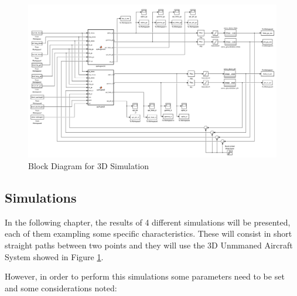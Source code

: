 \begin{figure}
	\centering
	\includegraphics[width=1.1\textwidth,height=1.1\textheight,keepaspectratio]{figures/diagram_3D.png}
	\caption{Block Diagram for 3D Simulation}
   	\label{fig:diagram3D}
\end{figure}

\clearpage


\subsection*{Simulations}

In the following chapter, the results of 4 different simulations will be presented, each of them exampling some specific characteristics. These will consist in short straight paths between two points and they will use the 3D Unmmaned Aircraft System showed in Figure \ref{fig:diagram3D}.

However, in order to perform this simulations some parameters need to be set and some considerations noted:

